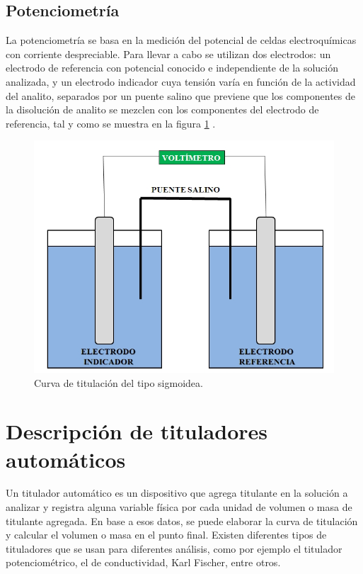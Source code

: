 
\subsection{Potenciometría}

La potenciometría se basa en la medición del potencial de celdas electroquímicas  con corriente despreciable. Para llevar a cabo se utilizan dos electrodos: un electrodo de referencia con potencial conocido e independiente de la solución analizada, y un electrodo indicador cuya tensión varía en función de la actividad del analito,  separados por un puente salino que previene que los componentes de la disolución de analito se mezclen con los componentes del electrodo de referencia, tal y como se muestra en la figura \ref{fig:potenciometria} \citep{BOOK:1}.

\begin{figure}[htbp]
	\centering
	\includegraphics[width=.5\textwidth]{./Figures/Potenciometria-img.jpg}
	\caption{Curva de titulación del tipo sigmoidea\protect\footnotemark.}
	\label{fig:potenciometria}
\end{figure}

\section{Descripción de tituladores automáticos}
\label{tituladoresAutomaticos}

Un titulador automático es un dispositivo que agrega titulante en la solución a analizar y registra alguna variable física por cada unidad de volumen o masa de titulante agregada. En base a esos datos, se puede elaborar la curva de titulación y calcular el volumen o masa en el punto final.
Existen diferentes tipos de tituladores que se usan para diferentes análisis, como por ejemplo el titulador potenciométrico, el de conductividad, Karl Fischer, entre otros.

